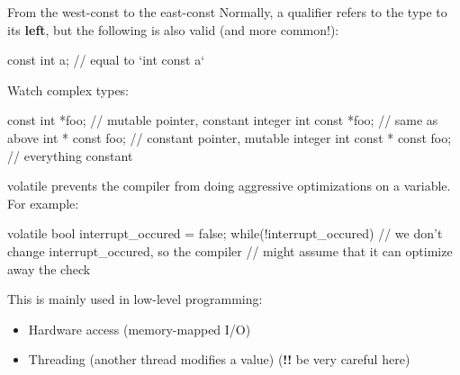 \documentclass[10pt,graphics,aspectratio=169,table]{beamer}
\begin{document}
\begin{frame}[fragile]{From the west-const to the east-const}
    \bigskip
    Normally, a qualifier refers to the type to its \textbf{left},
    but the following is also valid (and more common!):
    \begin{codeblock}
const int a;	        // equal to `int const a`
    \end{codeblock}

    Watch complex types:
    
    \begin{codeblock}
const int *foo;         // mutable pointer, constant integer
int const *foo;	        // same as above
int * const foo;        // constant pointer, mutable integer 
int const * const foo;  // everything constant 
    \end{codeblock}
    \end{frame}

    \begin{frame}[fragile]{volatile}
  prevents the compiler from doing aggressive
                optimizations on a variable. For example:

        \begin{codeblock}
volatile bool interrupt_occured = false;
while(!interrupt_occured){
    // we don't change interrupt_occured, so the compiler
    // might assume that it can optimize away the check
}
        \end{codeblock}

        This is mainly used in low-level programming:
        \begin{itemize}
            \item Hardware access (memory-mapped I/O)
            \item Threading (another thread modifies a value) (\textbf{!!} be very careful here)
        \end{itemize}
    \end{frame}
\end{document}
